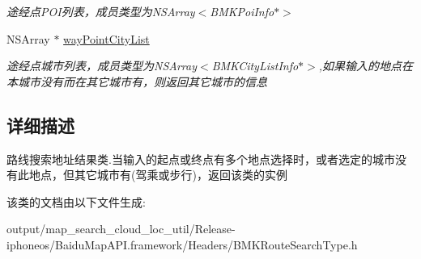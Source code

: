 \begin{DoxyCompactItemize}
\begin{DoxyCompactList}\small\item\em 途经点\+P\+O\+I列表，成员类型为\+N\+S\+Array$<$\+B\+M\+K\+Poi\+Info$\ast$$>$ \end{DoxyCompactList}\item 
\hypertarget{interface_b_m_k_suggest_addr_info_a3eeadb7f0eaaa514391a7f9565e9029a}{}N\+S\+Array $\ast$ \hyperlink{interface_b_m_k_suggest_addr_info_a3eeadb7f0eaaa514391a7f9565e9029a}{way\+Point\+City\+List}\label{interface_b_m_k_suggest_addr_info_a3eeadb7f0eaaa514391a7f9565e9029a}

\begin{DoxyCompactList}\small\item\em 途经点城市列表，成员类型为\+N\+S\+Array$<$\+B\+M\+K\+City\+List\+Info$\ast$$>$,如果输入的地点在本城市没有而在其它城市有，则返回其它城市的信息 \end{DoxyCompactList}\end{DoxyCompactItemize}


\subsection{详细描述}
路线搜索地址结果类.\+当输入的起点或终点有多个地点选择时，或者选定的城市没有此地点，但其它城市有(驾乘或步行)，返回该类的实例 

该类的文档由以下文件生成\+:\begin{DoxyCompactItemize}
\item 
output/map\+\_\+search\+\_\+cloud\+\_\+loc\+\_\+util/\+Release-\/iphoneos/\+Baidu\+Map\+A\+P\+I.\+framework/\+Headers/B\+M\+K\+Route\+Search\+Type.\+h\end{DoxyCompactItemize}
